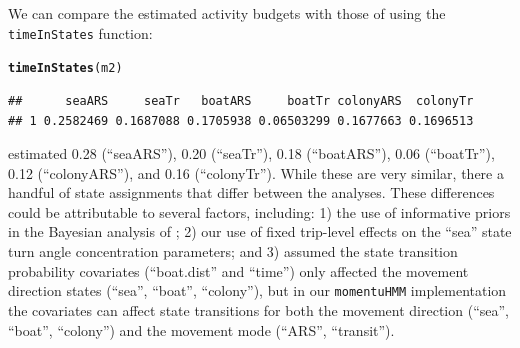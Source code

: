 \documentclass[12pt]{article}\usepackage[]{graphicx}\usepackage[]{xcolor}
\makeatletter
\newcommand{\hldef}[1]{\textcolor[rgb]{0.345,0.345,0.345}{#1}}%
\newcommand{\hlkwd}[1]{\textcolor[rgb]{0.737,0.353,0.396}{\textbf{#1}}}%
\newenvironment{kframe}{%
 \def\at@end@of@kframe{}%
 \ifinner\ifhmode%
  \def\at@end@of@kframe{\end{minipage}}%
  \begin{minipage}{\columnwidth}%
 \fi\fi%
 \def\FrameCommand##1{\hskip\@totalleftmargin \hskip-\fboxsep
 \colorbox{shadecolor}{##1}\hskip-\fboxsep
     \hskip-\linewidth \hskip-\@totalleftmargin \hskip\columnwidth}%
 \MakeFramed {\advance\hsize-\width
   \@totalleftmargin\z@ \linewidth\hsize
   \@setminipage}}%
 {\par\unskip\endMakeFramed%
 \at@end@of@kframe}
\newenvironment{knitrout}{}{} %
\makeatother
\begin{document}
We can compare the estimated activity budgets with those of \cite{PirottaEtAl2018} using the \verb|timeInStates| function:
\begin{knitrout}
\color{fgcolor}\begin{kframe}
\begin{alltt}
\hlkwd{timeInStates}\hldef{(m2)}
\end{alltt}
\end{kframe}
\end{knitrout}
\begin{knitrout}
\color{fgcolor}\begin{kframe}
\begin{verbatim}
##      seaARS     seaTr   boatARS     boatTr colonyARS  colonyTr
## 1 0.2582469 0.1687088 0.1705938 0.06503299 0.1677663 0.1696513
\end{verbatim}
\end{kframe}
\end{knitrout}
\noindent \cite{PirottaEtAl2018} estimated 0.28 (``seaARS''), 0.20 (``seaTr''), 0.18 (``boatARS''), 0.06 (``boatTr''), 0.12 (``colonyARS''), and 0.16 (``colonyTr''). While these are very similar, there a handful of state assignments that differ between the analyses. These differences could be attributable to several factors, including: 1) the use of informative priors in the Bayesian analysis of \cite{PirottaEtAl2018}; 2) our use of fixed trip-level effects on the ``sea'' state turn angle concentration parameters; and 3) \cite{PirottaEtAl2018} assumed the state transition probability covariates (``boat.dist'' and ``time'') only affected the movement direction states (``sea'', ``boat'', ``colony''), but in our \verb|momentuHMM| implementation the covariates can affect state transitions for both the movement direction (``sea'', ``boat'', ``colony'') and the movement mode (``ARS'', ``transit'').
\end{document}
